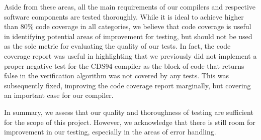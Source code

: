 Aside from these areas, all the main requirements of our compilers and respective 
software components are tested thoroughly. While it is ideal to achieve higher 
than 80\% code coverage in all categories, we believe that code coverage is useful in 
identifying potential areas of improvement for testing, but should not be used as the
sole metric for evaluating the quality of our tests. In fact, the code coverage report
was useful in highlighting that we previously did not implement a proper 
negative test for the CDS94 compiler as the block of code that returns false in 
the verification algorithm was not covered by any tests. This was subsequently fixed, 
improving the code coverage report marginally, but covering an important case 
for our compiler.

In summary, we assess that our quality and thoroughness of testing are sufficient 
for the scope of this project. However, we acknowledge that there is still room for
improvement in our testing, especially in the areas of error handling. 

